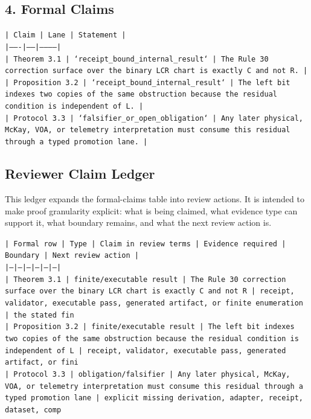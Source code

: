 \documentclass[11pt]{article}
\begin{document}
\subsection*{4. Formal Claims}

\noindent\texttt{| Claim | Lane | Statement |}\\
\noindent\texttt{|-------|------|-----------|}\\
\noindent\texttt{| Theorem 3.1 | `receipt\_bound\_internal\_result` | The Rule 30 correction surface over the binary LCR chart is exactly C and not R. |}\\
\noindent\texttt{| Proposition 3.2 | `receipt\_bound\_internal\_result` | The left bit indexes two copies of the same obstruction because the residual condition is independent of L. |}\\
\noindent\texttt{| Protocol 3.3 | `falsifier\_or\_open\_obligation` | Any later physical, McKay, VOA, or telemetry interpretation must consume this residual through a typed promotion lane. |}\\

\subsection*{Reviewer Claim Ledger}

This ledger expands the formal-claims table into review actions. It is intended to make proof granularity explicit: what is being claimed, what evidence type can support it, what boundary remains, and what the next review action is.

\noindent\texttt{| Formal row | Type | Claim in review terms | Evidence required | Boundary | Next review action |}\\
\noindent\texttt{|---|---|---|---|---|---|}\\
\noindent\texttt{| Theorem 3.1 | finite/executable result | The Rule 30 correction surface over the binary LCR chart is exactly C and not R | receipt, validator, executable pass, generated artifact, or finite enumeration | the stated fin}\\
\noindent\texttt{| Proposition 3.2 | finite/executable result | The left bit indexes two copies of the same obstruction because the residual condition is independent of L | receipt, validator, executable pass, generated artifact, or fini}\\
\noindent\texttt{| Protocol 3.3 | obligation/falsifier | Any later physical, McKay, VOA, or telemetry interpretation must consume this residual through a typed promotion lane | explicit missing derivation, adapter, receipt, dataset, comp}\\
\end{document}
